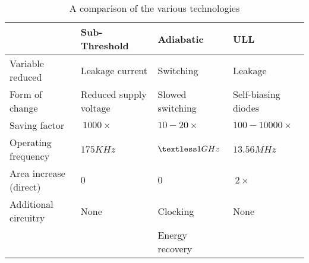\begin{table}[htbp]
	\centering
	\begin{tabular}{| l | p{165px} | p{165px} | p{165px} |}
		\hline
					& Sub-Threshold			& Adiabatic		& ULL					\\
		\hline
		Variable reduced	& Leakage current		& Switching		& Leakage				\\
		Form of change		& Reduced supply voltage	& Slowed switching	& Self-biasing diodes			\\
		Saving factor 		& $~1000\times$			& $10-20\times$		& $100-10000\times$			\\
		Operating frequency	& $175KHz$			& $\textless 1GHz$	& $13.56MHz$				\\
		Area increase (direct)	& $0$				& $0$			& $~2\times$				\\
		Additional circuitry	& None				& Clocking		& None					\\
					& 				& Energy recovery	& 					\\
		\hline 
	\end{tabular}
	\caption{A comparison of the various technologies}
	\label{tab:comparison}
\end{table}
